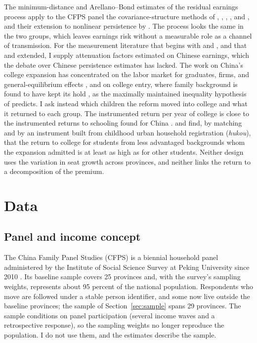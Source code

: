 \documentclass[11pt]{article}
\begin{document}
The minimum-distance and Arellano--Bond estimates of the residual earnings
process apply to the CFPS panel the covariance-structure methods of \citet{LillardWillis1978}, \citet{MaCurdy1982},
\citet{HallMishkin1982}, \citet{AbowdCard1989}, and
\citet{MeghirPistaferri2004}, and their extension to nonlinear persistence by
\citet{ArellanoBlundellBonhomme2017}. The process looks the same in the two groups, which leaves earnings risk without a measurable role as a channel
of transmission. For the measurement
literature that begins with \citet{Solon1992} and
\citet{Zimmerman1992}, and that \citet{Mazumder2005} and
\citet{HaiderSolon2006} extended, I supply attenuation factors
estimated on Chinese earnings, which the debate over Chinese
persistence estimates \citep{GongLeighMeng2012, DengGustafssonLi2013, FanYiZhang2021,
YuanLin2013} has lacked. The work on China's college expansion has concentrated on the labor market for graduates, firms, and general-equilibrium effects \citep{CheZhang2018, KnightDengLi2017, Ma2024IER}, and on college entry, where family background is found to have kept its hold \citep{Yeung2013}, as the maximally maintained inequality hypothesis of \citet{RafteryHout1993} predicts. I ask instead which children the reform moved into college and what it returned to each group. The instrumented return per year of college is close to the instrumented returns to schooling found for China \citep{HuangTaniWeiZhu2022, FangEtAl2012}. \citet{ChenZhuWang2026} and \citet{HuangTaniWeiZhu2022} find, by matching and by an instrument built from childhood urban household registration (\emph{hukou}), that the return to college for students from less advantaged backgrounds whom the expansion admitted is at least as high as for other students. Neither design uses the variation in seat growth across provinces, and neither links the
return to a decomposition of the premium.

\section{Data}
\label{sec:data}

\subsection{Panel and income concept}
\label{sec:income}

The China Family Panel Studies (CFPS) is a biennial household panel administered by the Institute of
Social Science Survey at Peking University since 2010 \citep{XieHu2014}. Its baseline sample covers 25 provinces and, with the survey's
sampling weights, represents about 95 percent of the national
population. Respondents who move are followed under a stable person identifier, and some now live outside the baseline provinces; the sample of Section~\ref{sec:sample} spans 29 provinces. The sample conditions on panel participation (several income waves and a retrospective response), so the sampling weights no longer reproduce the population. I do not use them, and the estimates describe the sample.
\end{document}
